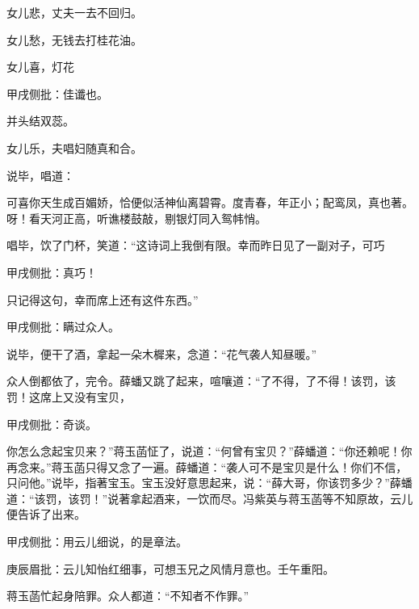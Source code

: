 \begin{poem}
    \begin{pl}
        女儿悲，丈夫一去不回归。
    \end{pl}

    \begin{pl}
        女儿愁，无钱去打桂花油。
    \end{pl}

    \begin{pl}女儿喜，灯花\end{pl}\begin{note}甲戌侧批：佳谶也。\end{note}\begin{pl}并头结双蕊。\end{pl}

    \begin{pl}

        女儿乐，夫唱妇随真和合。
    \end{pl}

\end{poem}

\begin{parag}
    说毕，唱道：
\end{parag}
\begin{poem}
    \begin{pl}
        可喜你天生成百媚娇，恰便似活神仙离碧霄。度青春，年正小；配鸾凤，真也著。呀！看天河正高，听谯楼鼓敲，剔银灯同入鸳帏悄。
    \end{pl}
\end{poem}

\begin{parag}
    唱毕，饮了门杯，笑道：“这诗词上我倒有限。幸而昨日见了一副对子，可巧\begin{note}甲戌侧批：真巧！\end{note}只记得这句，幸而席上还有这件东西。”\begin{note}甲戌侧批：瞒过众人。\end{note}说毕，便干了酒，拿起一朵木樨来，念道：“花气袭人知昼暖。”
\end{parag}


\begin{parag}
    众人倒都依了，完令。薛蟠又跳了起来，喧嚷道：“了不得，了不得！该罚，该罚！这席上又没有宝贝，\begin{note}甲戌侧批：奇谈。\end{note}你怎么念起宝贝来？”蒋玉菡怔了，说道：“何曾有宝贝？”薛蟠道：“你还赖呢！你再念来。”蒋玉菡只得又念了一遍。薛蟠道：“袭人可不是宝贝是什么！你们不信，只问他。”说毕，指著宝玉。宝玉没好意思起来，说：“薛大哥，你该罚多少？”薛蟠道：“该罚，该罚！”说著拿起酒来，一饮而尽。冯紫英与蒋玉菡等不知原故，云儿便告诉了出来。\begin{note}甲戌侧批：用云儿细说，的是章法。\end{note}\begin{note}庚辰眉批：云儿知怡红细事，可想玉兄之风情月意也。壬午重阳。\end{note}蒋玉菡忙起身陪罪。众人都道：“不知者不作罪。”
\end{parag}


